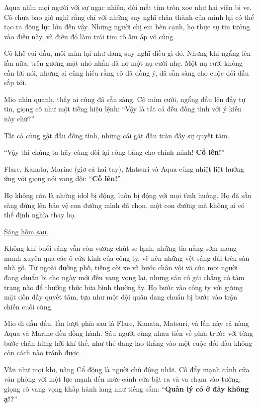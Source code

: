 \documentclass[../main.tex]{subfiles}
\begin{document}

Aqua nhìn mọi người với sự ngạc nhiên, đôi mắt tím tròn xoe như hai viên bi ve. Cô chưa bao giờ nghĩ rằng chỉ với những suy nghĩ chân thành của mình lại có thể tạo ra động lực lớn đến vậy. Những người chị em bên cạnh, họ thực sự tin tưởng vào điều này, và điều đó làm trái tim cô ấm áp vô cùng.

Cô khẽ cúi đầu, môi mím lại như đang suy nghĩ điều gì đó. Nhưng khi ngẩng lên lần nữa, trên gương mặt nhỏ nhắn đã nở một nụ cười nhẹ. Một nụ cười không cần lời nói, nhưng ai cũng hiểu rằng cô đã đồng ý, đã sẵn sàng cho cuộc đối đầu sắp tới.

Mio nhìn quanh, thấy ai cũng đã sẵn sàng. Cô mỉm cười, ngẩng đầu lên đầy tự tin, giọng cô như một tiếng hiệu lệnh: ``Vậy là tất cả đều đồng tình với ý kiến này chứ?''

Tất cả cùng gật đầu đồng tình, những cái gật đầu tràn đầy sự quyết tâm.

``Vậy thì chúng ta hãy cùng đòi lại công bằng cho chính mình! \textbf{Cố lên!}''

Flare, Kanata, Marine (giơ cả hai tay), Matsuri và Aqua cùng nhiệt liệt hưởng ứng với giọng nói vang dội: ``\textbf{Cố lên!}''

Họ không còn là những idol bị động, luôn bị động với mọi tình huống. Họ đã sẵn sàng đứng lên bảo vệ con đường mình đã chọn, một con đường mà không ai có thể định nghĩa thay họ.

\begin{center}
  \uline{Sáng hôm sau.}
\end{center}

Không khí buổi sáng vẫn còn vương chút se lạnh, những tia nắng sớm mỏng manh xuyên qua các ô cửa kính của công ty, vẽ nên những vệt sáng dài trên sàn nhà gỗ. Từ ngoài đường phố, tiếng còi xe và bước chân vội vã của mọi người đang chuẩn bị cho ngày mới đều vang vọng lại, nhưng sáu cô gái chẳng có tâm trạng nào để thưởng thức bữa bình thường ấy. Họ bước vào công ty với gương mặt dồn đầy quyết tâm, tựa như một đội quân đang chuẩn bị bước vào trận chiến cuối cùng.

Mio đi dẫn đầu, lần lượt phía sau là Flare, Kanata, Matsuri, và lần này cả nàng Aqua và Marine đều đồng hành. Sáu người cùng nhau tiến về phía trước với từng bước chân hừng hỡi khí thế, như thể đang lao thẳng vào một cuộc đối đầu không còn cách nào tránh được.

Vẫn như mọi khi, nàng Cổ động là người chủ động nhất. Cô đẩy mạnh cánh cửa văn phòng với một lực mạnh đến mức cánh cửa bật ra và va chạm vào tường, giọng cô vang vọng khắp hành lang như tiếng sấm: ``\textbf{Quản lý có ở đây không ạ!?}''
\end{document}
